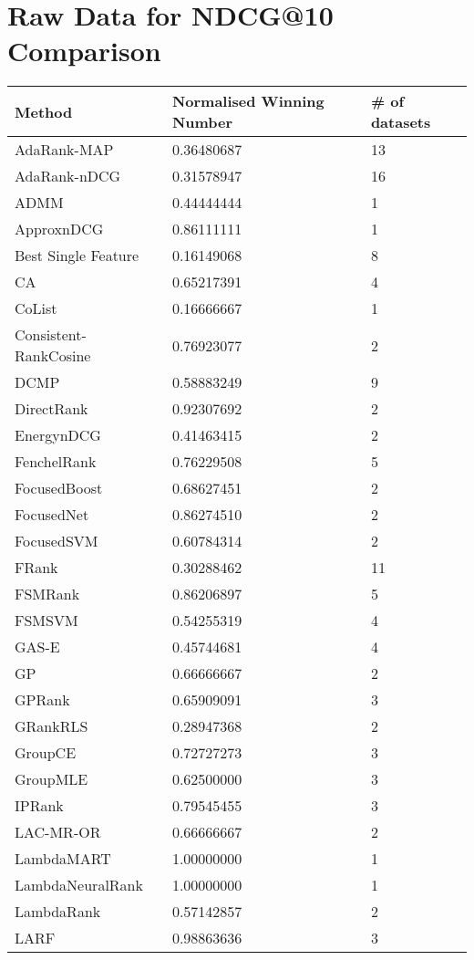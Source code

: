\chapter{Raw Data for NDCG@10 Comparison}
\label{app:norm_winnum_ndcg10}

\begin{longtable}{l|l|l}
Method & Normalised Winning Number & \# of datasets \\
\hline
AdaRank-\acs{MAP} & 0.36480687 & 13 \\ 
AdaRank-\acs{nDCG} & 0.31578947 & 16 \\ 
\acs{ADMM} & 0.44444444 & 1 \\ 
Approx\acs{nDCG} & 0.86111111 & 1 \\ 
Best Single Feature & 0.16149068 & 8 \\ 
CA & 0.65217391 & 4 \\ 
CoList & 0.16666667 & 1 \\ 
Consistent-RankCosine & 0.76923077 & 2 \\ 
DCMP & 0.58883249 & 9 \\ 
DirectRank & 0.92307692 & 2 \\ 
Energy\acs{nDCG} & 0.41463415 & 2 \\ 
FenchelRank & 0.76229508 & 5 \\ 
FocusedBoost & 0.68627451 & 2 \\ 
FocusedNet & 0.86274510 & 2 \\ 
Focused\acs{SVM} & 0.60784314 & 2 \\ 
FRank & 0.30288462 & 11 \\ 
FSMRank & 0.86206897 & 5 \\ 
FSM\acs{SVM} & 0.54255319 & 4 \\ 
GAS-E & 0.45744681 & 4 \\ 
\acs{GP} & 0.66666667 & 2 \\ 
\acs{GP}Rank & 0.65909091 & 3 \\ 
GRank\acs{RLS} & 0.28947368 & 2 \\ 
GroupCE & 0.72727273 & 3 \\ 
Group\acs{MLE} & 0.62500000 & 3 \\ 
\acs{IP}Rank & 0.79545455 & 3 \\ 
LAC-MR-OR & 0.66666667 & 2 \\ 
LambdaMART & 1.00000000 & 1 \\ 
LambdaNeuralRank & 1.00000000 & 1 \\ 
LambdaRank & 0.57142857 & 2 \\ 
LARF & 0.98863636 & 3 \\ 

\end{longtable}
